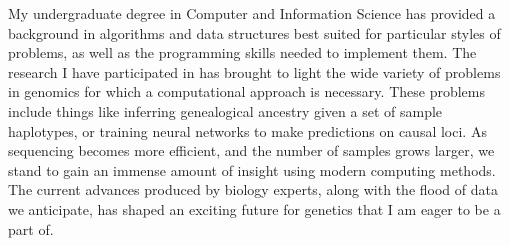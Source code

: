 \documentclass[12pt]{amsart}
\newcommand{\sepspace}{\vspace*{1em}}		%
\begin{document}
\sepspace

My undergraduate degree in Computer and Information Science has provided a background in algorithms and data structures best suited for particular styles of problems, as well as the programming skills needed to implement them. 
The research I have participated in has brought to light the wide variety of problems in genomics for which a computational approach is necessary.
These problems include things like inferring genealogical ancestry given a set of sample haplotypes, or training neural networks to make predictions on causal loci.
As sequencing becomes more efficient, and the number of samples grows larger, we stand to gain an immense amount of insight using modern computing methods.
The current advances produced by biology experts, along with the flood of data we anticipate, has shaped an exciting future for genetics that I am eager to be a part of. 
\sepspace
\end{document}

